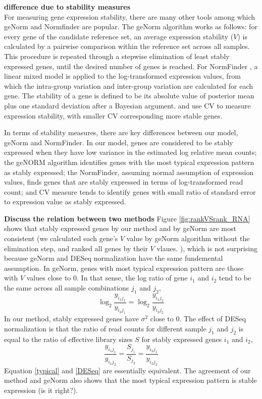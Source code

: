 \documentclass[11pt, a4paper]{article}
\begin{document}
\textbf{difference due to stability measures}\\
For measuring gene expression stability, there are many other tools among which geNorm \citep{vandesompele2002accurate} and Normfinder \citep{andersen2004normalization} are popular. The geNorm algorithm works as follows: for every gene of the candidate reference set, an average expression stability ($V$) is calculated by a pairwise comparison within the reference set across all samples. This procedure is repeated through a stepwise elimination of least stably expressed genes, until the desired number of genes is reached. For NormFinder \citep{andersen2004normalization}, a linear mixed model is applied to the log-transformed expression values, from which the intra-group variation and inter-group variation are calculated for each gene. The stability of a gene is defined to be its absolute value of posterior mean plus one standard deviation after a Bayesian argument. \cite{czechowski2005genome} and \cite{dekkers2012identification} use CV to measure expression stability, with smaller CV corresponding more stable genes.  
 
 In terms of stability measures, there are key differences between our model, geNorm and NormFinder. In our model, genes are considered to be stably expressed when they have low variance in the estimated log relative mean counts; the geNORM algorithm identifies genes with the most typical expression pattern as stably expressed; the NormFinder, assuming normal assumption of expression values,  finds genes that are stably expressed in terms of log-transformed read count; and CV measure tends to identify genes with small ratio of standard error to expression value as stably expressed. 

\textbf{Discuss the relation between two methods}
Figure \ref{fig:rankVSrank_RNA} shows that stably expressed genes by our method and by geNorm are most consistent (we calculated each gene's $V$ value by geNorm algorithm without the elimination step, and ranked all genes by their $V$ vlaues. ), which is not surprising because geNorm and DESeq normalization have the same fundemental assumption. In geNorm, genes with most typical expression pattern are those with $V$ values close to 0. In that sense, the log ratio of gene $i_1$ and $i_2$  tend to be the same across all sample combinations $j_1$ and $j_2$, 
 \begin{equation}\label{typical}
 \log_2\frac{y_{i_1j_1}}{y_{i_2j_1}} = \log_2\frac{y_{i_1j_2}}{y_{i_2j_2}}
 \end{equation}
 In our method, stably expressed genes have $\sigma^2$ close to 0.  The effect of DESeq normalization is that the ratio of read counts for different sample $j_1$ and $j_2$ is equal to the ratio of effective library sizes $S$ for stably expressed genes $i_1$ and $i_2$,
\begin{equation}\label{DESeq}
 \frac{y_{i_1j_1}}{y_{i_1j_2}} = \frac{S_{j_1}}{S_{j_2}}=\frac{y_{i_2j_1}}{y_{i_2j_2}} 
\end{equation}
 Equation \ref{typical} and \ref{DESeq} are essentially equivalent. The agreement of our method and geNorm also shows that the most typical expression pattern is stable expression (is it right?). 
\end{document}
